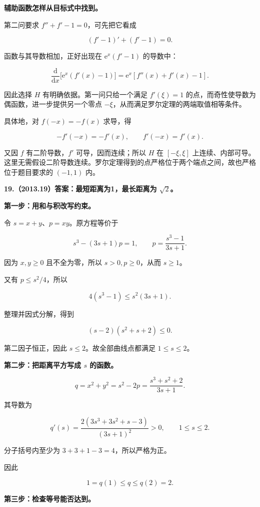 \documentclass[UTF8,11pt,fontset=windows]{ctexart}
\begin{document}
\textbf{辅助函数怎样从目标式中找到。}

第二问要求 $f''+f'-1=0$，可先把它看成

$$
(f'-1)'+(f'-1)=0.
$$

函数与其导数相加，正好出现在 $\mathrm e^x(f'-1)$ 的导数中：

$$
\frac{\mathrm d}{\mathrm dx}\bigl[\mathrm e^x(f'(x)-1)\bigr]
=\mathrm e^x[f''(x)+f'(x)-1].
$$

因此选择 $H$ 有明确依据。第一问只给一个满足 $f'(\xi)=1$ 的点，而奇性使导数为偶函数，进一步提供另一个零点 $-\xi$，从而满足罗尔定理的两端取值相等条件。

具体地，对 $f(-x)=-f(x)$ 求导，得

$$
-f'(-x)=-f'(x),\qquad f'(-x)=f'(x).
$$

又因 $f$ 有二阶导数，$f'$ 可导，因而连续；所以 $H$ 在 $[-\xi,\xi]$ 上连续、内部可导。这里无需假设二阶导数连续。罗尔定理得到的点严格位于两个端点之间，故也严格位于题目要求的 $(-1,1)$ 内。

\clearpage

\textbf{19.（2013.19）答案：最短距离为1，最长距离为 $\sqrt2$。}

\textbf{第一步：用和与积改写约束。}

令 $s=x+y$、$p=xy$。原方程等价于

$$
s^3-(3s+1)p=1,
\qquad p=\frac{s^3-1}{3s+1}.
$$

因为 $x,y\ge0$ 且不全为零，所以 $s>0,p\ge0$，从而 $s\ge1$。

又有 $p\le s^2/4$，所以

$$
4(s^3-1)\le s^2(3s+1).
$$

整理并因式分解，得到

$$
(s-2)(s^2+s+2)\le0.
$$

第二因子恒正，因此 $s\le2$。故全部曲线点都满足 $1\le s\le2$。

\textbf{第二步：把距离平方写成 $s$ 的函数。}

$$
q=x^2+y^2=s^2-2p
=\frac{s^3+s^2+2}{3s+1}.
$$

其导数为

$$
q'(s)=\frac{2(3s^3+3s^2+s-3)}{(3s+1)^2}>0,
\qquad1\le s\le2.
$$

分子括号内至少为 $3+3+1-3=4$，所以严格为正。

因此

$$
1=q(1)\le q\le q(2)=2.
$$

\textbf{第三步：检查等号能否达到。}
\end{document}
